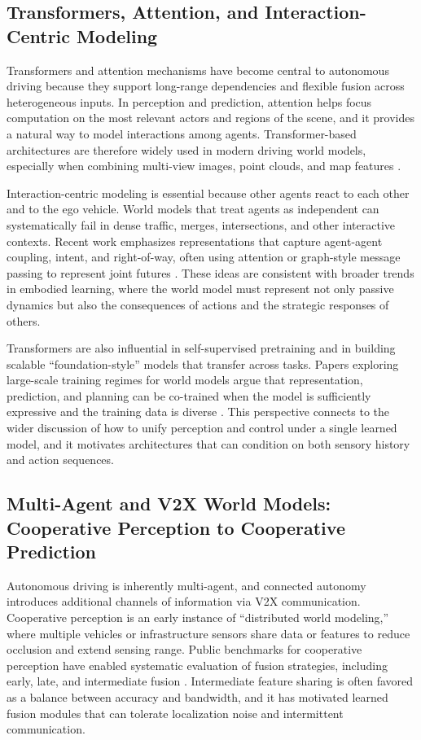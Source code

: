 \subsection{Transformers, Attention, and Interaction-Centric Modeling}

Transformers and attention mechanisms have become central to autonomous driving because they support long-range dependencies and flexible fusion across heterogeneous inputs. In perception and prediction, attention helps focus computation on the most relevant actors and regions of the scene, and it provides a natural way to model interactions among agents. Transformer-based architectures are therefore widely used in modern driving world models, especially when combining multi-view images, point clouds, and map features \cite{Vasudevan2024}.

Interaction-centric modeling is essential because other agents react to each other and to the ego vehicle. World models that treat agents as independent can systematically fail in dense traffic, merges, intersections, and other interactive contexts. Recent work emphasizes representations that capture agent-agent coupling, intent, and right-of-way, often using attention or graph-style message passing to represent joint futures \cite{Long2025,Feng2025}. These ideas are consistent with broader trends in embodied learning, where the world model must represent not only passive dynamics but also the consequences of actions and the strategic responses of others.

Transformers are also influential in self-supervised pretraining and in building scalable “foundation-style” models that transfer across tasks. Papers exploring large-scale training regimes for world models argue that representation, prediction, and planning can be co-trained when the model is sufficiently expressive and the training data is diverse \cite{Wu2025,Xie2025}. This perspective connects to the wider discussion of how to unify perception and control under a single learned model, and it motivates architectures that can condition on both sensory history and action sequences.

\subsection{Multi-Agent and V2X World Models: Cooperative Perception to Cooperative Prediction}

Autonomous driving is inherently multi-agent, and connected autonomy introduces additional channels of information via V2X communication. Cooperative perception is an early instance of “distributed world modeling,” where multiple vehicles or infrastructure sensors share data or features to reduce occlusion and extend sensing range. Public benchmarks for cooperative perception have enabled systematic evaluation of fusion strategies, including early, late, and intermediate fusion \cite{Xu2021}. Intermediate feature sharing is often favored as a balance between accuracy and bandwidth, and it has motivated learned fusion modules that can tolerate localization noise and intermittent communication.

